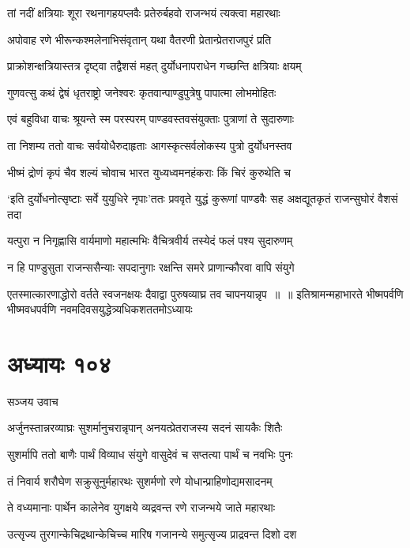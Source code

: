 \twolineshloka
{तां नदीं क्षत्रियाः शूरा रथनागहयप्लवैः}
{प्रतेरुर्बहवो राजन्भयं त्यक्त्वा महारथाः}


\twolineshloka
{अपोवाह रणे भीरून्कश्मलेनाभिसंवृतान्}
{यथा वैतरणी प्रेतान्प्रेतराजपुरं प्रति}


\twolineshloka
{प्राक्रोशन्क्षत्रियास्तत्र दृष्ट्वा तद्वैशसं महत्}
{दुर्योधनापराधेन गच्छन्ति क्षत्रियाः क्षयम्}


\twolineshloka
{गुणवत्सु कथं द्वेषं धृतराष्ट्रो जनेश्वरः}
{कृतवान्पाण्डुपुत्रेषु पापात्मा लोभमोहितः}


\twolineshloka
{एवं बहुविधा वाचः श्रूयन्ते स्म परस्परम्}
{पाण्डवस्तवसंयुक्ताः पुत्राणां ते सुदारुणाः}


\twolineshloka
{ता निशम्य ततो वाचः सर्वयोधैरुदाहृताः}
{आगस्कृत्सर्वलोकस्य पुत्रो दुर्योधनस्तव}


\twolineshloka
{भीष्मं द्रोणं कृपं चैव शल्यं चोवाच भारत}
{युध्यध्वमनहंकराः किं चिरं कुरुथेति च}


\twolineshloka
{`इति दुर्योधनोत्सृष्टाः सर्वे युयुधिरे नृपाः'ततः प्रववृते युद्धं कुरूणां पाण्डवैः सह}
{अक्षद्यूतकृतं राजन्सुघोरं वैशसं तदा}


\twolineshloka
{यत्पुरा न निगृह्णासि वार्यमाणो महात्मभिः}
{वैचित्रवीर्य तस्येदं फलं पश्य सुदारुणम्}


\twolineshloka
{न हि पाण्डुसुता राजन्ससैन्याः सपदानुगाः}
{रक्षन्ति समरे प्राणान्कौरवा वापि संयुगे}


\twolineshloka
{एतस्मात्कारणाद्धोरो वर्तते स्वजनक्षयः}
{दैवाद्वा पुरुषव्याघ्र तव चापनयान्नृप ॥ ॥ इतिश्रामन्महाभारते भीष्मपर्वणि भीष्मवधपर्वणि नवमदिवसयुद्धेत्र्यधिकशततमोऽध्यायः}


\chapter{अध्यायः १०४}
\twolineshloka
{सञ्जय उवाच}
{}


\twolineshloka
{अर्जुनस्तान्नरव्याघ्रः सुशर्मानुचरान्नृपान्}
{अनयत्प्रेतराजस्य सदनं सायकैः शितैः}


\twolineshloka
{सुशर्मापि ततो बाणैः पार्थं विव्याध संयुगे}
{वासुदेवं च सप्तत्या पार्थं च नवभिः पुनः}


\twolineshloka
{तं निवार्य शरौघेण सक्रुसूनुर्महारथः}
{सुशर्मणो रणे योधान्प्राहिणोद्यमसादनम्}


\twolineshloka
{ते वध्यमानाः पार्थेन कालेनेव युगक्षये}
{व्यद्रवन्त रणे राजन्भये जाते महारथाः}


\twolineshloka
{उत्सृज्य तुरगान्केचिद्रथान्केचिच्च मारिष}
{गजानन्ये समुत्सृज्य प्राद्रवन्त दिशो दश}


